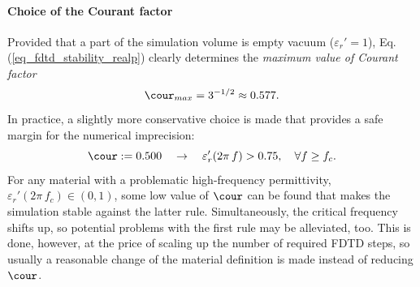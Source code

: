 \paragraph{Choice of the Courant factor}%
Provided that a part of the simulation volume is empty vacuum ($\varepsilon_r'=1$), Eq. (\ref{eq_fdtd_stability_realp}) clearly determines the \textit{maximum value of Courant factor} 
$$\cour_{max} = 3^{-1/2}\approx0.577.$$
In practice, a slightly more conservative choice is made that provides a safe margin for the numerical imprecision: 
\begin{equation} \cour:= 0.500 \quad \rightarrow \quad \varepsilon_r'(2\pi\,f)> 0.75, \quad \forall f \geq f_c. \label{eq_courant_choice}\end{equation}
For any material with a problematic high-frequency permittivity, $\varepsilon_r'(2\pi\,f_c) \in (0, 1)$, some low value of $\cour$ can be found that makes the simulation stable against the latter rule. Simultaneously, the critical frequency shifts up, so potential problems with the first rule may be alleviated, too. This is done, however, at the price of scaling up the number of required FDTD steps, so usually a reasonable change of the material definition is made instead of reducing $\cour$.




